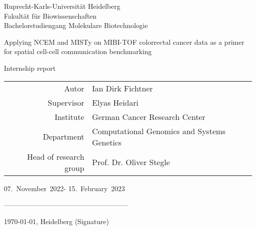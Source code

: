 \documentclass[parskip]{scrreprt}
\newcommand{\workauthor}{Ian Dirk Fichtner}
\newcommand{\worktitle}{ Applying NCEM and MISTy on MIBI-TOF colorrectal cancer data as a primer for spatial cell-cell communication benchmarking}
\newcommand{\workstart}{07.~November~2022}
\newcommand{\workstop}{15.~February~2023}
\newcommand{\submissiondate}{\today}
\newcommand{\institute}{German Cancer Research Center}
\newcommand{\department}{Computational Genomics and Systems Genetics}
\newcommand{\supervisor}{Elyas Heidari}
\newcommand{\headrg}{Prof. Dr. Oliver Stegle}
\newcommand{\worktype}{Internship report}
\begin{document}
\begin{titlepage}
	\centering
	{\Large Ruprecht-Karls-Universität Heidelberg\\
			Fakultät für Biowissenschaften\\
			Bachelorstudiengang Molekulare Biotechnologie\\}
	
	{
		{\Huge \worktitle{}}}
	
	{\Large \worktype{}}
	
	
	{\large
	\begin{tabular}{r l}
		Autor &\workauthor{}\\
		Supervisor &\supervisor{}\\
		Institute &\institute{}\\
		Department &\department{}\\
		Head of research group &\headrg{}\\
	\end{tabular}
	}
	\vspace{1cm}

	\workstart \quad- \workstop
	\vspace{1cm}
	
	------------------------------------------------------

	\submissiondate, Heidelberg (Signature)
		
	
	
	
\end{titlepage}


\tableofcontents





\setcounter{secnumdepth}{-1}




%






\end{document}
